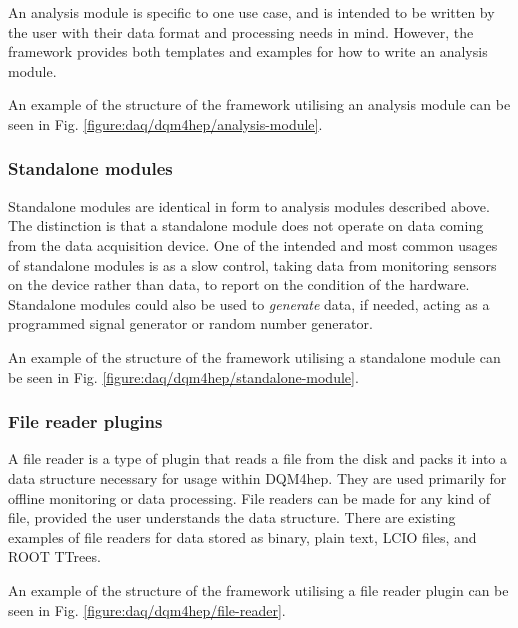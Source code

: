 An analysis module is specific to one use case, and is intended to be written by the user with their data format and processing needs in mind. However, the framework provides both templates and examples for how to write an analysis module. 

An example of the structure of the framework utilising an analysis module can be seen in Fig. \ref{figure:daq/dqm4hep/analysis-module}.

\subsubsection{Standalone modules}
Standalone modules are identical in form to analysis modules described above. The distinction is that a standalone module does not operate on data coming from the data acquisition device. One of the intended and most common usages of standalone modules is as a slow control, taking data from monitoring sensors on the device rather than data, to report on the condition of the hardware. Standalone modules could also be used to \emph{generate} data, if needed, acting as a programmed signal generator or random number generator. 

An example of the structure of the framework utilising a standalone module can be seen in Fig. \ref{figure:daq/dqm4hep/standalone-module}.

\subsubsection{File reader plugins}
A file reader is a type of plugin that reads a file from the disk and packs it into a data structure necessary for usage within \acrshort{DQM4hep}. They are used primarily for offline monitoring or data processing. File readers can be made for any kind of file, provided the user understands the data structure. There are existing examples of file readers for data stored as binary, plain text, \acrshort{LCIO} files, and ROOT TTrees. 

An example of the structure of the framework utilising a file reader plugin can be seen in Fig. \ref{figure:daq/dqm4hep/file-reader}.

